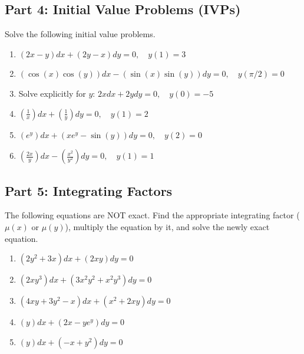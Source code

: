 \documentclass[11pt]{article}
\begin{document}
\subsection*{Part 4: Initial Value Problems (IVPs)}
Solve the following initial value problems.
\begin{enumerate}[label=\textbf{\arabic*.}, resume]
    \item $(2x - y)dx + (2y - x)dy = 0, \quad y(1) = 3$
    \item $(\cos(x)\cos(y))dx - (\sin(x)\sin(y))dy = 0, \quad y(\pi/2) = 0$
    \item Solve explicitly for $y$: $2x dx + 2y dy = 0, \quad y(0) = -5$
    \item $(\frac{1}{x})dx + (\frac{1}{y})dy = 0, \quad y(1) = 2$
    \item $(e^y)dx + (x e^y - \sin(y))dy = 0, \quad y(2) = 0$
    \item $(\frac{2x}{y})dx - (\frac{x^2}{y^2})dy = 0, \quad y(1) = 1$
\end{enumerate}

\subsection*{Part 5: Integrating Factors}
The following equations are NOT exact. Find the appropriate integrating factor ($\mu(x)$ or $\mu(y)$), multiply the equation by it, and solve the newly exact equation.
\begin{enumerate}[label=\textbf{\arabic*.}, resume]
    \item $(2y^2 + 3x)dx + (2xy)dy = 0$
    \item $(2xy^3)dx + (3x^2 y^2 + x^2 y^3)dy = 0$
    \item $(4xy + 3y^2 - x)dx + (x^2 + 2xy)dy = 0$
    \item $(y)dx + (2x - y e^y)dy = 0$
    \item $(y)dx + (-x + y^2)dy = 0$
\end{enumerate}
\end{document}
